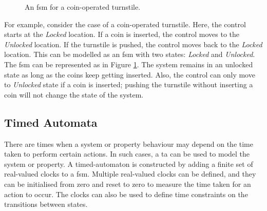 \begin{figure}[htbp] 
 \centering
 \caption{An \gls{fsm} for a coin-operated turnstile.}
 \label{fig:fsm}
\end{figure}

For example, consider the case of a coin-operated turnstile. Here, the control starts at the \emph{Locked} location. If a coin is inserted, the control moves to the \emph{Unlocked} location. If the turnstile is pushed, the control moves back to the \emph{Locked} location. This can be modelled as an \gls{fsm} with two states: \emph{Locked} and \emph{Unlocked}. The \gls{fsm} can be represented as in Figure \ref{fig:fsm}. The system remains in an unlocked state as long as the coins keep getting inserted. Also, the control can only move to \emph{Unlocked} state if a coin is inserted; pushing the turnstile without inserting a coin will not change the state of the system.





\subsection{Timed Automata}
There are times when a system or property behaviour may depend on the time taken to perform certain actions. In such cases, a \gls{ta} can be used to model the system or property. A timed-automaton is constructed by adding a finite set of real-valued clocks to a \gls{fsm}. Multiple real-valued clocks can be defined, and they can be initialised from zero and reset to zero to measure the time taken for an action to occur. The clocks can also be used to define time constraints on the transitions between states. 


